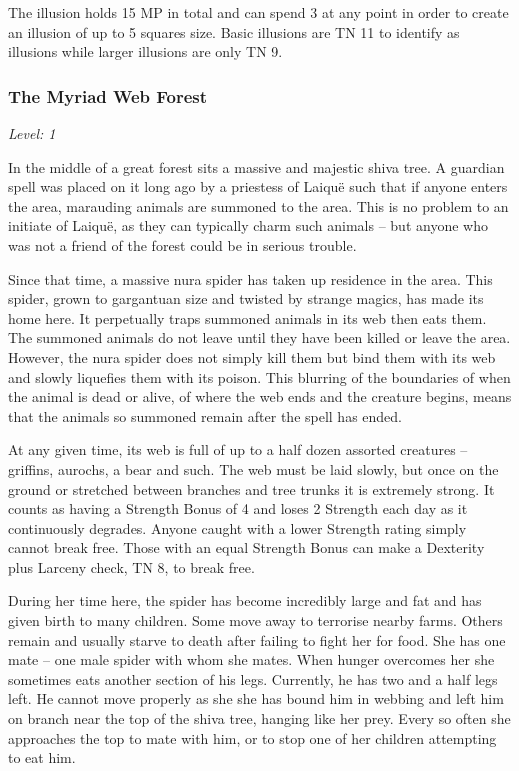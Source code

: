 \begin{multicols}{2}
The illusion holds 15 MP in total and can spend 3 at any point in order to create an illusion of up to 5 squares size.  Basic illusions are TN 11 to identify as illusions while larger illusions are only TN 9.

\subsubsection{The Myriad Web Forest}

\textit{Level: 1}

In the middle of a great forest sits a massive and majestic shiva tree.
A guardian spell was placed on it long ago by a priestess of Laiqu\"{e} such that if anyone enters the area, marauding animals are summoned to the area.
This is no problem to an initiate of Laiqu\"{e}, as they can typically charm such animals -- but anyone who was not a friend of the forest could be in serious trouble.

Since that time, a massive nura spider has taken up residence in the area.  This spider, grown to gargantuan size and twisted by strange magics, has made its home here.  It perpetually traps summoned animals in its web then eats them.  The summoned animals do not leave until they have been killed or leave the area.  However, the nura spider does not simply kill them but bind them with its web and slowly liquefies them with its poison.  This blurring of the boundaries of when the animal is dead or alive, of where the web ends and the creature begins, means that the animals so summoned remain after the spell has ended.

At any given time, its web is full of up to a half dozen assorted creatures -- griffins, aurochs, a bear and such.  The web must be laid slowly, but once on the ground or stretched between branches and tree trunks it is extremely strong.  It counts as having a Strength Bonus of 4 and loses 2 Strength each day as it continuously degrades.  Anyone caught with a lower Strength rating simply cannot break free.  Those with an equal Strength Bonus can make a Dexterity plus Larceny check, TN 8, to break free.

During her time here, the spider has become incredibly large and fat and has given birth to many children.  Some move away to terrorise nearby farms.  Others remain and usually starve to death after failing to fight her for food.  She has one mate -- one male spider with whom she mates.  When hunger overcomes her she sometimes eats another section of his legs.  Currently, he has two and a half legs left.  He cannot move properly as she she has bound him in webbing and left him on branch near the top of the shiva tree, hanging like her prey.  Every so often she approaches the top to mate with him, or to stop one of her children attempting to eat him.


\end{multicols}
